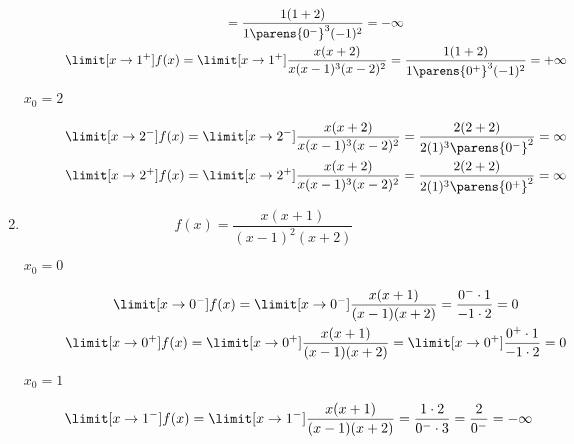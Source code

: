 \begin{enumerate}[label={\alph*)}]
    \item
        \begin{equation*}
            f(x) = \frac{x(x + 1)}{(x - 1)^2(x + 2)}
        \end{equation*}
        \begin{description}
            \item[\(x_0 = 0\)]
                \begin{gather*}
                    \limit[x \to 0^-] f(x)
                        = \limit[x \to 0^-] \frac{x(x + 1)}{(x - 1)(x + 2)}
                        = \frac{0^- \cdot 1}{-1 \cdot 2}
                        = 0\\
                    \limit[x \to 0^+] f(x)
                        = \limit[x \to 0^+] \frac{x(x + 1)}{(x - 1)(x + 2)}
                        = \limit[x \to 0^+] \frac{0^+ \cdot 1}{-1 \cdot 2}
                        = 0
                \end{gather*}
            \item[\(x_0 = 1\)]
                \begin{gather*}
                    \limit[x \to 1^-] f(x)
                        = \limit[x \to 1^-] \frac{x(x + 1)}{(x - 1)(x + 2)}
                        = \frac{1 \cdot 2}{0^- \cdot 3}
                        = \frac{2}{0^-}
                        = -\infty\\

\end{gather*}
\end{description}
\end{enumerate}
